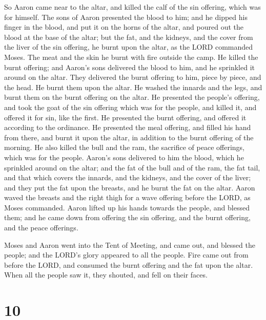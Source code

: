  So Aaron came near to the altar, and killed the calf of the
sin offering, which was for himself.  The sons of Aaron
presented the blood to him; and he dipped his finger in the blood, and
put it on the horns of the altar, and poured out the blood at the base
of the altar;  but the fat, and the kidneys, and the cover
from the liver of the sin offering, he burnt upon the altar, as the LORD
commanded Moses.  The meat and the skin he burnt with fire
outside the camp.  He killed the burnt offering; and
Aaron's sons delivered the blood to him, and he sprinkled it around on
the altar.  They delivered the burnt offering to him, piece
by piece, and the head. He burnt them upon the altar.  He
washed the innards and the legs, and burnt them on the burnt offering on
the altar.  He presented the people's offering, and took
the goat of the sin offering which was for the people, and killed it,
and offered it for sin, like the first.  He presented the
burnt offering, and offered it according to the ordinance. 
He presented the meal offering, and filled his hand from there, and
burnt it upon the altar, in addition to the burnt offering of the
morning.  He also killed the bull and the ram, the
sacrifice of peace offerings, which was for the people. Aaron's sons
delivered to him the blood, which he sprinkled around on the altar;
 and the fat of the bull and of the ram, the fat tail, and
that which covers the innards, and the kidneys, and the cover of the
liver;  and they put the fat upon the breasts, and he burnt
the fat on the altar.  Aaron waved the breasts and the
right thigh for a wave offering before the LORD, as Moses commanded.
 Aaron lifted up his hands towards the people, and blessed
them; and he came down from offering the sin offering, and the burnt
offering, and the peace offerings.

 Moses and Aaron went into the Tent of Meeting, and came
out, and blessed the people; and the LORD's glory appeared to all the
people.  Fire came out from before the LORD, and consumed
the burnt offering and the fat upon the altar. When all the people saw
it, they shouted, and fell on their faces.

\hypertarget{section-9}{%
\section{10}\label{section-9}}

